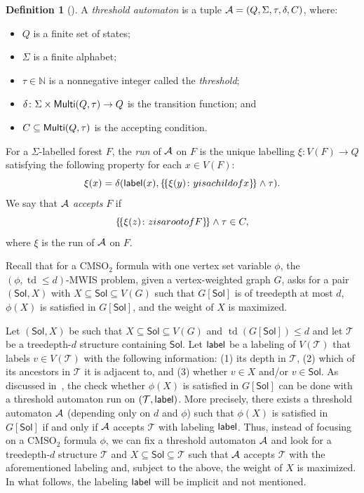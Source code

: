 \documentclass[11pt,a4paper]{article}
\DeclareMathOperator{\td}{td}
\theoremstyle{definition}
\newtheorem{definition}[theorem]{Definition}
\def\N{\mathbb{N}}
\def\T{\mathcal{T}}
\def\Sol{\mathsf{Sol}}
\newcommand{\CMSO}{\textsf{CMSO}$_2$\xspace}
\newcommand{\cmsotwo}{\CMSO}
\begin{document}
\begin{definition}[\cite{DBLP:conf/soda/ChudnovskyMPPR24}]
 A {\em{threshold automaton}} is a tuple $\mathcal{A}=(Q,\Sigma,\tau,\delta,C)$, where:
 \begin{itemize}[nosep]
  \item $Q$ is a finite set of states;
  \item $\Sigma$ is a finite alphabet;
  \item $\tau\in \N$ is a nonnegative integer called the {\em{threshold}};
  \item $\delta\colon \Sigma\times \mathsf{Multi}(Q,\tau)\to Q$ is the transition function; and
  \item $C\subseteq \mathsf{Multi}(Q,\tau)$ is the accepting condition.
 \end{itemize}
 For a $\Sigma$-labelled forest $F$, the {\em{run}} of $\mathcal{A}$ on $F$ is the unique labelling $\xi\colon V(F)\to Q$ satisfying the following property for each $x\in V(F)$:
 $$\xi(x)=\delta(\lbl(x),\lmset\xi(y)\colon y\textrm{ is a child of }x\rmset\wedge \tau).$$
 We say that $\mathcal{A}$ {\em{accepts}} $F$ if 
 $$\lmset\xi(z)\colon z\textrm{ is a root of }F\rmset\wedge \tau \in C,$$
 where $\xi$ is the run of $\mathcal{A}$ on $F$.
\end{definition}

Recall that for a \cmsotwo formula with one vertex set variable $\phi$,
the $(\phi, \td \leq d)$-\textsc{MWIS} problem,
given a vertex-weighted graph $G$, asks for a pair $(\Sol,X)$
with $X \subseteq \Sol \subseteq V(G)$ such that $G[\Sol]$ is of treedepth at most $d$,
$\phi(X)$ is satisfied in $G[\Sol]$, and the weight of $X$ is maximized. 

Let $(\Sol, X)$ be such that $X \subseteq \Sol \subseteq V(G)$ and
$\td(G[\Sol]) \leq d$ and let $\T$ be a treedepth-$d$ structure containing $\Sol$. 
Let $\mathsf{label}$ be a labeling of $V(\T)$ that labels $v \in V(\T)$ with 
the following information: (1) its depth in $\T$, (2) which of its ancestors
in $\T$ it is adjacent to, and (3) whether $v \in X$ and/or $v \in \Sol$. 
As discussed in~\cite{DBLP:conf/soda/ChudnovskyMPPR24}, the check 
whether $\phi(X)$ is satisfied in $G[\Sol]$ can be done
with a threshold automaton run on $(\T,\lbl)$.
More precisely, there exists a threshold automaton $\mathcal{A}$
(depending only on $d$ and $\phi$) such that $\phi(X)$ is satisfied in $G[\Sol]$
if and only if $\mathcal{A}$ accepts $\T$ with labeling $\mathsf{label}$. 
Thus, instead of focusing on a \cmsotwo formula $\phi$, we
can fix a threshold automaton $\mathcal{A}$ and look for a
treedepth-$d$ structure $\T$ and $X \subseteq \Sol \subseteq \T$
such that $\mathcal{A}$ accepts $\T$ with the aforementioned labeling
and, subject to the above, the weight of $X$ is maximized. 
In what follows, the labeling $\mathsf{label}$ will be implicit and not mentioned. 
\end{document}

